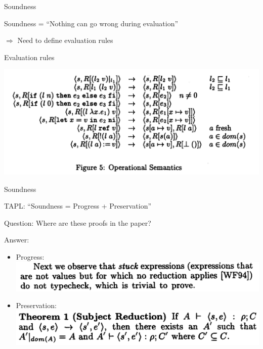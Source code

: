 \documentclass{beamer}
\begin{document}
\begin{frame}{Soundness}

Soundness = ``Nothing can go wrong during evaluation''

$\Longrightarrow$ Need to define evaluation rules

\end{frame}

\begin{frame}{Evaluation rules}
\begin{center}
\includegraphics[scale=0.55]{paper_figure_5.png}
\end{center}
\end{frame}

\begin{frame}{Soundness}

TAPL: ``Soundness = Progress + Preservation''

Question: Where are these proofs in the paper?

\pause

Answer:
\begin{itemize}
\item Progress:\\
\includegraphics[scale=0.6]{paper_progress.png}
\item Preservation:\\
\includegraphics[scale=0.6]{paper_preservation.png}
\end{itemize}

\end{frame}
\end{document}
